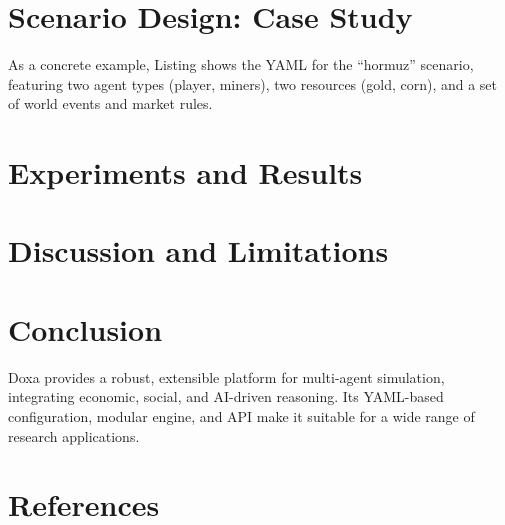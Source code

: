 \documentclass{article}
\begin{document}
\section{Scenario Design: Case Study}
\label{sec:case-study}
As a concrete example, Listing shows the YAML for the ``hormuz'' scenario, featuring two agent types (player, miners), two resources (gold, corn), and a set of world events and market rules.




\section{Experiments and Results}

\section{Discussion and Limitations}

\section{Conclusion}
Doxa provides a robust, extensible platform for multi-agent simulation, integrating economic, social, and AI-driven reasoning. Its YAML-based configuration, modular engine, and API make it suitable for a wide range of research applications.

\section*{References}
\end{document}
